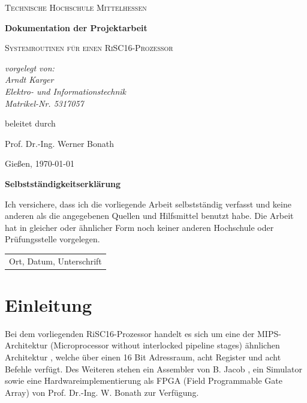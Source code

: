 \documentclass[fleqn, a4paper, 11pt]{article}       %
\begin{document}
\begin{titlepage}
	\centering
	{\scshape\LARGE Technische Hochschule Mittelhessen \par}
	\vspace{1cm}
	{\huge\bfseries Dokumentation der Projektarbeit \par}
	\vspace{1.5cm}
	{\scshape\Large Systemroutinen für einen RiSC16-Prozessor \par}
	\vspace{2cm}
	{\Large\itshape vorgelegt von: \\ Arndt Karger \\ Elektro-  und Informationstechnik\\ Matrikel-Nr. 5317057\par}
	\vfill
	beleitet durch\par
    Prof. Dr.-Ing. Werner Bonath
	\vfill

	{\large Gießen, \today\par}
\end{titlepage}

\thispagestyle{empty}
{\huge\bfseries Selbstständigkeitserklärung \par}
\vspace{1cm}

\noindent Ich versichere, dass ich die vorliegende Arbeit selbstständig verfasst und keine anderen als die angegebenen
Quellen und Hilfsmittel benutzt habe. Die Arbeit hat in gleicher oder ähnlicher Form noch keiner anderen
Hochschule oder Prüfungsstelle vorgelegen.

\vspace{4cm}
\begin{flushleft}
\begin{tabular}{@{}l@{}}\hline
Ort, Datum, Unterschrift
\end{tabular}
\end{flushleft}

\newpage
\thispagestyle{empty}
\tableofcontents
\newpage
\setcounter{page}{1}

\section{Einleitung}
Bei dem vorliegenden RiSC16-Prozessor handelt es sich um eine der MIPS-Architektur (Microprocessor without interlocked pipeline stages) \cite{MIPS} ähnlichen Architektur \cite{Ausschr}, welche über einen 16 Bit Adressraum, acht Register und acht Befehle verfügt. Des Weiteren stehen ein Assembler von B. Jacob \cite{JACOB}, ein Simulator \cite{Bonath} sowie eine Hardwareimplementierung als FPGA (Field Programmable Gate Array) von Prof. Dr.-Ing. W. Bonath zur Verfügung. 
\end{document}
